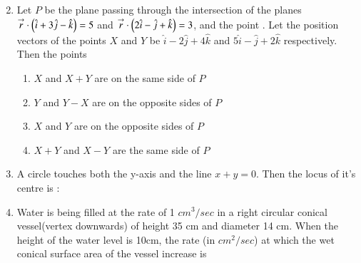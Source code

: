 \documentclass[journal,,12pt,onecolumn]{IEEEtran}
\theoremstyle{remark}
\begin{document}
\begin{enumerate}
\begin{enumerate}
\begin{multicols}{2}
    \end{multicols}
        \end{enumerate}
\bigskip
\item Let $P$ be the plane passing through the intersection of the planes $\overset{\rightarrow}{r}\cdot \left(\hat{i}+3\hat{j}-\hat{k}\right)=5$ and $\overset{\rightarrow}{r}\cdot \left(2\hat{i}-\hat{j}+\hat{k}\right)=3$, and the point . Let the position vectors of the points $X$ and $Y$ be $\hat{i}-2\hat{j}+4\hat{k}$ and $5\hat{i}-\hat{j}+2\hat{k}$ respectively. Then the points 
\begin{enumerate}
    \item $X$ and $X+Y$ are on the same side of $P$
    \item $Y$ and $Y-X$ are on the opposite sides of $P$
    \item $X$ and $Y$ are on the opposite sides of $P$
    \item $X+Y$ and $X-Y$ are the same side of $P$
\end{enumerate}
\bigskip
\item A circle touches both the y-axis and the line $x+y=0$. Then the locus of it's centre is :
\begin{enumerate}
\end{enumerate}
\bigskip
\item Water is being filled at the rate of 1 ${cm}^3/sec$ in a right circular conical vessel(vertex downwards) of height 35 cm and diameter 14 cm. When the height of the water level is 10cm, the rate (in ${cm}^2/sec$) at which the wet conical surface area of the vessel increase is
\begin{enumerate}
\end{enumerate}
\end{enumerate}
\end{document}
